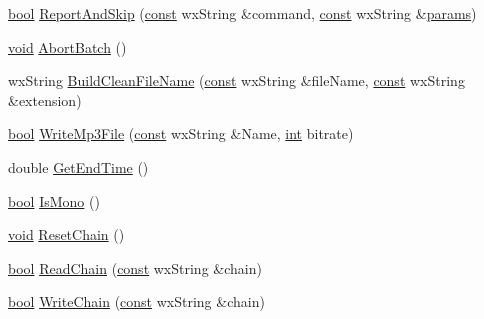 \begin{DoxyCompactItemize}
\item 
\hyperlink{mac_2config_2i386_2lib-src_2libsoxr_2soxr-config_8h_abb452686968e48b67397da5f97445f5b}{bool} \hyperlink{class_batch_commands_a979d4a55092349a3b45a53e248b257a5}{Report\+And\+Skip} (\hyperlink{getopt1_8c_a2c212835823e3c54a8ab6d95c652660e}{const} wx\+String \&command, \hyperlink{getopt1_8c_a2c212835823e3c54a8ab6d95c652660e}{const} wx\+String \&\hyperlink{_reverb_8cpp_aacc5617877d2aa4d17c729c1c8ba4eec}{params})
\item 
\hyperlink{sound_8c_ae35f5844602719cf66324f4de2a658b3}{void} \hyperlink{class_batch_commands_a0d89f3144aeca50b5ceeab0e18376fb4}{Abort\+Batch} ()
\item 
wx\+String \hyperlink{class_batch_commands_a398aa0ea5189e185f9a74b3572976a7a}{Build\+Clean\+File\+Name} (\hyperlink{getopt1_8c_a2c212835823e3c54a8ab6d95c652660e}{const} wx\+String \&file\+Name, \hyperlink{getopt1_8c_a2c212835823e3c54a8ab6d95c652660e}{const} wx\+String \&extension)
\item 
\hyperlink{mac_2config_2i386_2lib-src_2libsoxr_2soxr-config_8h_abb452686968e48b67397da5f97445f5b}{bool} \hyperlink{class_batch_commands_a158934ee3a433102eefb38aa2bf1ed3c}{Write\+Mp3\+File} (\hyperlink{getopt1_8c_a2c212835823e3c54a8ab6d95c652660e}{const} wx\+String \&Name, \hyperlink{xmltok_8h_a5a0d4a5641ce434f1d23533f2b2e6653}{int} bitrate)
\item 
double \hyperlink{class_batch_commands_a8f3f7a2de6661668b050d69e9540543d}{Get\+End\+Time} ()
\item 
\hyperlink{mac_2config_2i386_2lib-src_2libsoxr_2soxr-config_8h_abb452686968e48b67397da5f97445f5b}{bool} \hyperlink{class_batch_commands_ace953e507ffcf3b5a79df2b3e1a8d8ce}{Is\+Mono} ()
\item 
\hyperlink{sound_8c_ae35f5844602719cf66324f4de2a658b3}{void} \hyperlink{class_batch_commands_a1abf98081b50014fc9a59918d85ebbc7}{Reset\+Chain} ()
\item 
\hyperlink{mac_2config_2i386_2lib-src_2libsoxr_2soxr-config_8h_abb452686968e48b67397da5f97445f5b}{bool} \hyperlink{class_batch_commands_a38404c141631c64eafca84e32e351906}{Read\+Chain} (\hyperlink{getopt1_8c_a2c212835823e3c54a8ab6d95c652660e}{const} wx\+String \&chain)
\item 
\hyperlink{mac_2config_2i386_2lib-src_2libsoxr_2soxr-config_8h_abb452686968e48b67397da5f97445f5b}{bool} \hyperlink{class_batch_commands_ab5a0615168ba01255b570ad40aacf1b4}{Write\+Chain} (\hyperlink{getopt1_8c_a2c212835823e3c54a8ab6d95c652660e}{const} wx\+String \&chain)
\item 

\end{DoxyCompactItemize}

